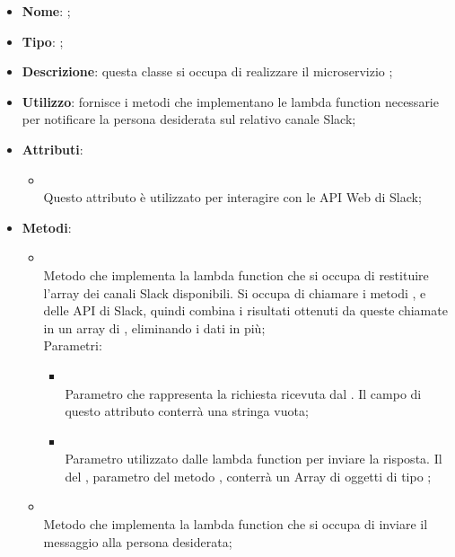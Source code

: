 \begin{itemize}
	\item \textbf{Nome}: ;
	\item \textbf{Tipo}: ;
	\item \textbf{Descrizione}: questa classe si occupa di realizzare il microservizio ;
	\item \textbf{Utilizzo}: fornisce i metodi che implementano le lambda function necessarie per notificare la persona desiderata sul relativo canale Slack;
	\item \textbf{Attributi}:
	\begin{itemize}
		\item[]  \\
		Questo attributo è utilizzato per interagire con le API Web di Slack;
	\end{itemize}
	\item \textbf{Metodi}:
	\begin{itemize}
		\item[]  \\
		Metodo che implementa la lambda function che si occupa di restituire l'array dei canali Slack disponibili. Si occupa di chiamare i metodi ,  e  delle API di Slack, quindi combina i risultati ottenuti da queste chiamate in un array di , eliminando i dati in più;\\
		Parametri:
		\begin{itemize}
			\item {} \\
			Parametro che rappresenta la richiesta ricevuta dal . Il campo  di questo attributo conterrà una stringa vuota;
			\item {} \\
			Parametro utilizzato dalle lambda function per inviare la risposta. Il  del , parametro del metodo , conterrà un Array di oggetti di tipo ;
		\end{itemize}
		\item[]  \\
		Metodo che implementa la lambda function che si occupa di inviare il messaggio alla persona desiderata;\\

\end{itemize}
\end{itemize}
